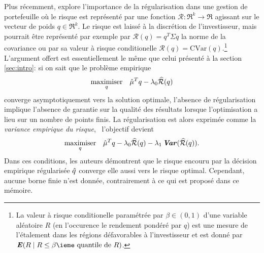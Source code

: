 Plus récemment, \cite{ban2016machine} explore l'importance de la régularisation dans une
gestion de portefeuille où le risque est représenté par une fonction
$\mathcal{R}:\Re^k \to \Re$ agissant sur le vecteur de poids $q \in \Re^k$. Le risque est laissé à
la discrétion de l'investisseur, mais pourrait être représenté par exemple par
$\mathcal{R}(q) = q^T\Sigma q$ la norme de la covariance ou par sa valeur à risque
conditionelle $\mathcal{R}(q) = \mathrm{CVar}(q)$.\footnote{La valeur à risque
  conditionelle paramétrée par $\beta\in(0,1)$ d'une variable aléatoire $R$ (en l'occurence le
  rendement pondéré par $q$) est une mesure de l'étalement dans les régions défavorables à
  l'investisseur et est donné par $\E (R \mid R \leq \text{$\beta$\ieme quantile de
    $R$})$.} L'argument offert est essentiellement le même que celui présenté à la section
\ref{sec:intro}: si on sait que le problème empirique
\begin{equation}
  \maximizeEquation[q]{\hat \mu^Tq - \lambda_0\widehat{\mathcal{R}}(q)}
\end{equation}
converge asymptotiquement vers la solution optimale, l'absence de régularisation implique
l'absence de garantie sur la qualité des résultats lorsque l'optimisation a lieu sur un
nombre de points finis. La régularisation est alors exprimée comme la \textit{variance
  empirique du risque}, \ie\ l'objectif devient
\begin{equation}
  \maximizeEquation[q]{\hat \mu^Tq - \lambda_0\widehat{\mathcal{R}}(q) - \lambda_1\Var(\widehat{\mathcal{R}}(q)).}
\end{equation}
Dans ces conditions, les auteurs démontrent que le risque encouru par la décision
empirique régularisée $\qh$ converge elle aussi vers le risque optimal. Cependant, aucune
borne finie n'est donnée, contrairement à ce qui est proposé dans ce mémoire.


